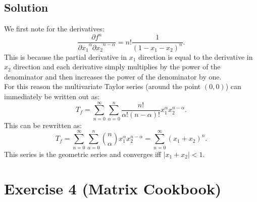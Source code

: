 \documentclass[10pt]{article}
\numberwithin{equation}{section}
\begin{document}
\subsection*{Solution}
We first note for the derivatives:
$$
\frac{\partial f^n}{{\partial x_1}^\alpha{\partial x_2}^{n-\alpha}} = n! \frac{1}{{(1 - x_1 - x_2)}^n}.  
$$
This is because the partial derivative in $x_1$ direction is equal to the derivative in $x_2$ direction and each derivative simply multiplies by the power of the denominator and then increases the power of the denominator by one. \\
For this reason the multivariate Taylor series (around the point $(0, 0)$) can immediately be written out as:
$$
T_f = \sum_{n=0}^\infty \sum_{\alpha=0}^n \frac{n!}{\alpha! (n-\alpha)!}x_1^\alpha x_2^{n-\alpha}.
$$
This can be rewritten as:
$$
T_f = \sum_{n=0}^\infty \sum_{\alpha=0}^n \binom{n}{\alpha} x_1^\alpha x_2^{n-\alpha} = \sum_{n=0}^\infty (x_1 + x_2)^n.
$$
This series is the geometric series and converges iff $|x_1 + x_2| < 1$.  
\section*{Exercise 4 (Matrix Cookbook)}
\end{document}
